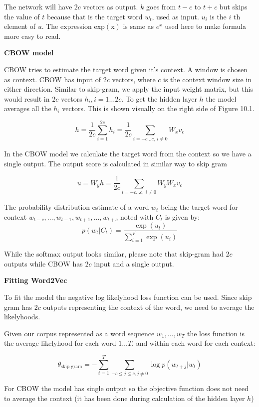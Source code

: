 The network will have \(2c\) vectors as output. \(k\) goes from \(t-c\) to \(t+c\) but skips the value of \(t\) because that is the target word \(w_t\), used as input. \(u_i\) is the \(i\) th element of \(u\). The expression \(\operatorname{exp(x)}\) is same as \(e^x\) used here to make formula more easy to read.

\textbf{CBOW model}

CBOW tries to estimate the target word given it's context. A window is chosen as context. CBOW has input of \(2c\) vectors, where \(c\) is the context window size in either direction. Similar to skip-gram, we apply the input weight matrix, but this would result in \(2c\) vectors \(h_i, i = 1 \ldots 2c\). To get the hidden layer \(h\) the model averages all the \(h_i\) vectors. This is shown visually on the right side of Figure 10.1.

\[h = \frac{1}{2c} \sum_{i = 1}^{2c} h_i = \frac{1}{2c} \sum_{i = -c \ldots c ,\  i \ne 0} W_x v_c\]

In the CBOW model we calculate the target word from the context so we have a single output. The output score is calculated in similar way to skip gram

\[u = W_y h = \frac{1}{2c} \sum_{i = -c \ldots c ,\  i \ne 0} W_y W_x v_c\]

The probability distribution estimate of a word \(w_t\) being the target word for context \(w_{t-c}, \ldots, w_{t-1}, w_{t+1}, \ldots, w_{t+c}\) noted with \(C_t\) is given by:
\[p(w_t|C_t) = \frac{\exp(u_{t})}{\sum_{i=1}^{V} \exp(u_i)} \]

While the softmax output looks similar, please note that skip-gram had \(2c\) outputs while CBOW has \(2c\) input and a single output.

\textbf{Fitting Word2Vec}

To fit the model the negative log likelyhood loss function can be used. Since skip gram has \(2c\) outputs representing the context of the word, we need to average the likelyhoods.

Given our corpus represented as a word sequence \(w_1, \ldots, w_T\) the loss function is the average likelyhood for each word \(1 \ldots T\), and within each word for each context:

\[\theta_{\operatorname{skip\ gram}} = -\sum_{t=1}^{T} \sum_{-c \leq j \leq c, j \neq 0} \log p(w_{t+j}|w_t)\]

For CBOW the model has single output so the objective function does not need to average the context (it has been done during calculation of the hidden layer \(h\))

